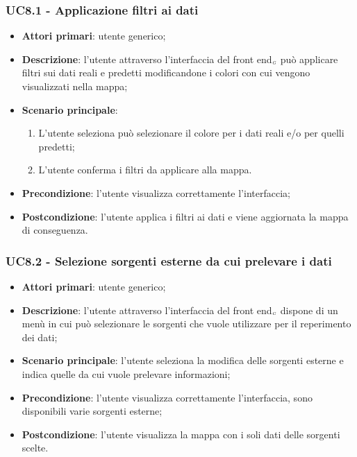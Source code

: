 \subsubsection{UC8.1 - Applicazione filtri ai dati}\label{applicazioneFiltri}
\begin{itemize}
	\item \textbf{Attori primari}: utente generico;
	\item \textbf{Descrizione}: l'utente attraverso l'interfaccia del front end$_{\scaleto{G}{3pt}}$ può applicare filtri sui dati reali e predetti modificandone i colori con cui vengono visualizzati nella mappa;
	\item \textbf{Scenario principale}: 
	\begin{enumerate}
		\item L'utente seleziona può selezionare il colore per i dati reali e/o per quelli predetti;
		\item L'utente conferma i filtri da applicare alla mappa. 
	\end{enumerate}
	\item \textbf{Precondizione}: l'utente visualizza correttamente l'interfaccia;
	\item \textbf{Postcondizione}: l'utente applica i filtri ai dati e viene aggiornata la mappa di conseguenza. 
\end{itemize}

\subsubsection{UC8.2 - Selezione sorgenti esterne da cui prelevare i dati}\label{selezioneSorgenti}
\begin{itemize}
	\item \textbf{Attori primari}: utente generico;
	\item \textbf{Descrizione}: l'utente attraverso l'interfaccia del front end$_{\scaleto{G}{3pt}}$ dispone di un menù in cui può selezionare le sorgenti che vuole utilizzare per il reperimento dei dati;
	\item \textbf{Scenario principale}: l'utente seleziona la modifica delle sorgenti esterne e indica quelle da cui vuole prelevare informazioni;
	\item \textbf{Precondizione}: l'utente visualizza correttamente l'interfaccia, sono disponibili varie sorgenti esterne;
	\item \textbf{Postcondizione}: l'utente visualizza la mappa con i soli dati delle sorgenti scelte. 
\end{itemize}

